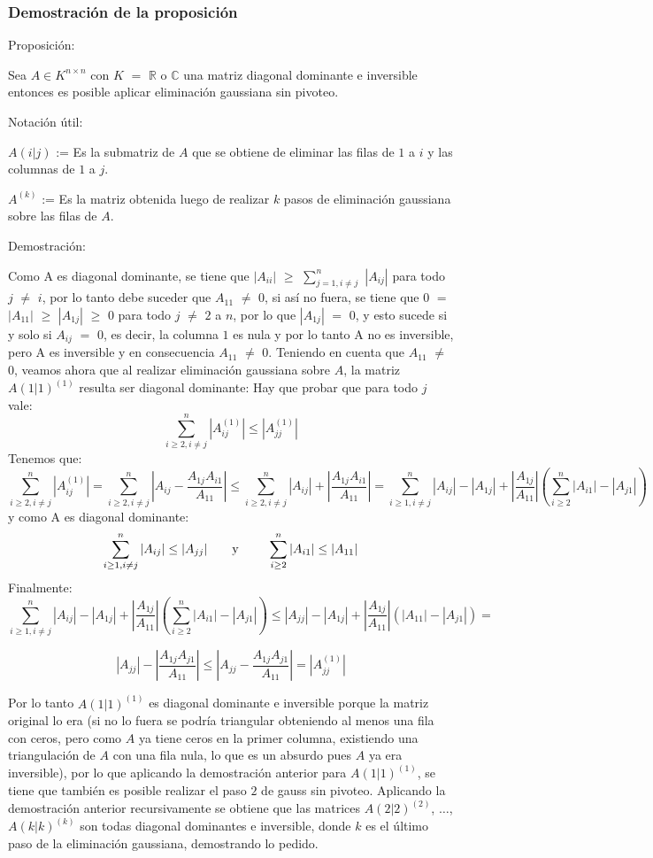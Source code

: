 \subsubsection{Demostración de la proposición}
Proposición:

Sea $A \in K^{n \times n}$ con $K$ $=$ $\mathbb{R}$ o $\mathbb{C}$ una matriz diagonal dominante e inversible entonces es posible aplicar eliminación gaussiana sin pivoteo.

Notación útil: 

$A(i|j)$ := Es la submatriz de $A$ que se obtiene de eliminar las filas de $1$ a $i$ y las columnas de $1$ a $j$.

$A^{(k)}$ := Es la matriz obtenida luego de realizar $k$ pasos de eliminación gaussiana sobre las filas de $A$.

Demostración:

Como A es diagonal dominante, se tiene que $|A_{ii}|$ $\geq$ $\sum_{j=1, i \neq j}^{n}$ $|A_{ij}|$ para todo $j$ $\neq$ $i$, por lo tanto debe suceder que $A_{11}$ $\neq$ $0$, si así no fuera, se tiene que $0$ $=$ $|A_{11}|$ $\geq$ $|A_{1j}|$  $\geq$ $0$ para todo $j$ $\neq$ $2$ a $n$, por lo que $|A_{1j}|$ $=$ $0$, y esto sucede si y solo si $A_{ij}$ $=$ $0$, es decir, la columna $1$ es nula y por lo tanto A no es inversible, pero A es inversible y en consecuencia $A_{11}$ $\neq$ $0$.
Teniendo en cuenta que $A_{11}$ $\neq$ $0$, veamos ahora que al realizar eliminación gaussiana sobre $A$, la matriz $A(1|1)^{(1)}$ resulta ser diagonal dominante:
Hay que probar que para todo $j$ vale:
\[
\sum_{i \geq 2, i \neq j}^{n}|A_{ij}^{(1)}| \leq  |A_{jj}^{(1)}| 
\]
Tenemos que:
\[
\sum_{i \geq 2, i \neq j}^{n} |A_{ij}^{(1)}| =  \sum_{i \geq 2, i \neq j}^{n} |A_{ij} - \frac{A_{1j}A_{i1}}{A_{11}}| \leq 
\sum_{i \geq 2, i \neq j}^{n} |A_{ij}| + |\frac{A_{1j}A_{i1}}{A_{11}}| =
\sum_{i \geq 1, i \neq j}^{n} |A_{ij}| - |A_{1j}| + |\frac{A_{1j}}{A_{11}}|(\sum_{i \geq 2}^{n} |A_{i1}| - |A_{j1}|)
\]
y como A es diagonal dominante:
\[
\sum_{i \geq 1, i \neq j}^{n} |A_{ij}| \leq |A_{jj}| \text{\qquad y \qquad} \sum_{i \geq 2}^{n} |A_{i1}| \leq |A_{11}|
\]
Finalmente:
\[
\sum_{i \geq 1, i \neq j}^{n} |A_{ij}| - |A_{1j}| + |\frac{A_{1j}}{A_{11}}|(\sum_{i \geq 2}^{n} |A_{i1}| - |A_{j1}|) \leq
|A_{jj}| - |A_{1j}| + |\frac{A_{1j}}{A_{11}}|(|A_{11}| - |A_{j1}|) =
\]

\[
|A_{jj}| - |\frac{A_{1j}A_{j1}}{A_{11}}| \leq
|A_{jj} - \frac{A_{1j}A_{j1}}{A_{11}}| = |A_{jj}^{(1)}|
\]

Por lo tanto $A(1|1)^{(1)}$ es diagonal dominante e inversible porque la matriz original lo era (si no lo fuera se podría triangular obteniendo al menos una fila con ceros, pero como $A$ ya tiene ceros en la primer columna, existiendo una triangulación de $A$ con una fila nula, lo que es un absurdo pues $A$ ya era inversible), por lo que aplicando la demostración anterior para $A(1|1)^{(1)}$, se tiene que también es posible realizar el paso $2$ de gauss sin pivoteo. Aplicando la demostración anterior recursivamente se obtiene que las matrices $A(2|2)^{(2)}$, $\ldots$, $A(k|k)^{(k)}$ son todas diagonal dominantes e inversible, donde $k$ es el último paso de la eliminación gaussiana, demostrando lo pedido.

